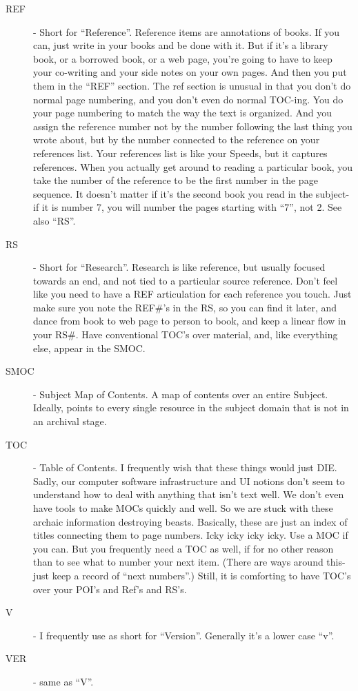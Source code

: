 \documentclass[oneside]{book}
\begin{document}
\begin{description}
\item[REF] - Short for ``Reference''. Reference items are annotations of
books. If you can, just write in your books and be done with it. But
if it's a library book, or a borrowed book, or a web page, you're
going to have to keep your co-writing and your side notes on your own
pages. And then you put them in the ``REF'' section. The ref section is
unusual in that you don't do normal page numbering, and you don't even
do normal TOC-ing. You do your page numbering to match the way the
text is organized. And you assign the reference number not by the
number following the last thing you wrote about, but by the number
connected to the reference on your references list. Your references
list is like your Speeds, but it captures references. When you
actually get around to reading a particular book, you take the number of
the reference to be the first number in the page sequence. It doesn't
matter if it's the second book you read in the subject- if it is
number 7, you will number the pages starting with ``7'', not 2. See also ``RS''.

\item[RS] - Short for ``Research''. Research is like reference, but usually
focused towards an end, and not tied to a particular source
reference. Don't feel like you need to have a REF articulation for
each reference you touch. Just make sure you note the REF\#'s in the
RS, so you can find it later, and dance from book to web page to
person to book, and keep a linear flow in your RS\#. Have conventional
TOC's over material, and, like everything else, appear in the SMOC.

\item[SMOC] - Subject Map of Contents. A map of contents over an entire
Subject. Ideally, points to every single resource in the subject
domain that is not in an archival stage.

\item[TOC] - Table of Contents. I frequently wish that these things would
just DIE. Sadly, our computer software infrastructure and UI notions
don't seem to understand how to deal with anything that isn't text
well. We don't even have tools to make MOCs quickly and well. So we
are stuck with these archaic information destroying beasts. Basically,
these are just an index of titles connecting them to page
numbers. Icky icky icky icky. Use a MOC if you can. But you frequently
need a TOC as well, if for no other reason than to see what to number
your next item. (There are ways around this- just keep a record of
``next numbers''.) Still, it is comforting to have TOC's over your POI's
and Ref's and RS's.

\item[V] - I frequently use as short for ``Version''. Generally it's a lower
case ``v''.

\item[VER] - same as ``V''.
\end{description}
\end{document}
